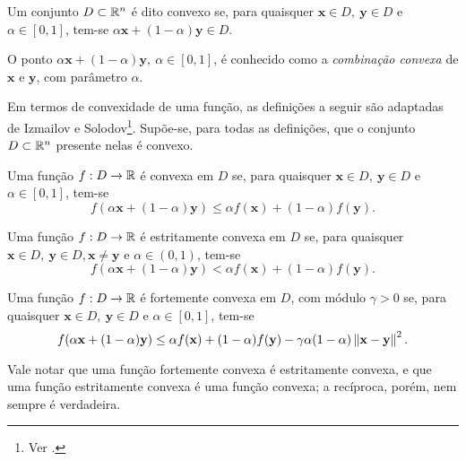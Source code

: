 \begin{definition}
Um conjunto $D \subset \mathbb{R}^{n}$ \'{e} dito convexo se, para quaisquer $\mathbf{x} \in D,~\mathbf{y} \in D$ e $\alpha \in [0,1]$, tem-se $\alpha\mathbf{x} + (1-\alpha)\mathbf{y} \in D$.
\end{definition}

O ponto $\alpha\mathbf{x} + (1-\alpha)\mathbf{y},~\alpha \in [0,1]$, \'{e} conhecido como a \textit{combina\c{c}\~{a}o convexa} de $\mathbf{x}$ e $\mathbf{y}$, com par\^{a}metro $\alpha$.

Em termos de convexidade de uma fun\c{c}\~{a}o, as defini\c{c}\~{o}es a seguir s\~{a}o adaptadas de Izmailov e Solodov\footnote{Ver \cite[pp. 66-70]{izmailov}.}. Sup\~{o}e-se, para todas as defini\c{c}\~{o}es, que o conjunto $D \subset \mathbb{R}^{n}$ presente nelas \'{e} convexo.

\begin{definition}\label{convDef}
Uma fun\c{c}\~{a}o $f: D \to \mathbb{R}$ \'{e} convexa em $D$ se, para quaisquer $\mathbf{x} \in D,~\mathbf{y} \in D$ e $\alpha \in [0,1]$, tem-se
\begin{equation}
f(\alpha\mathbf{x} + (1-\alpha)\mathbf{y}) \le \alpha f(\mathbf{x}) + (1-\alpha)f(\mathbf{y}).
\end{equation}
\end{definition}

\begin{definition}
Uma fun\c{c}\~{a}o $f: D \to \mathbb{R}$ \'{e} estritamente convexa em $D$ se, para quaisquer $\mathbf{x} \in D,~\mathbf{y} \in D, \mathbf{x} \ne \mathbf{y}$ e $\alpha \in (0,1)$, tem-se
\begin{equation}
f(\alpha\mathbf{x} + (1-\alpha)\mathbf{y}) < \alpha f(\mathbf{x}) + (1-\alpha)f(\mathbf{y}).
\end{equation}
\end{definition}

\begin{definition}
Uma fun\c{c}\~{a}o $f: D \to \mathbb{R}$ \'{e} fortemente convexa em $D$, com m\'{o}dulo $\gamma > 0$ se, para quaisquer $\mathbf{x} \in D,~\mathbf{y} \in D$ e $\alpha \in [0,1]$, tem-se
\begin{equation}
f(\alpha\mathbf{x} + (1-\alpha)\mathbf{y}) \le \alpha f(\mathbf{x}) + (1-\alpha)f(\mathbf{y}) - \gamma\alpha(1-\alpha)\left\lVert\mathbf{x}-\mathbf{y}\right\rVert^2.
\end{equation}
\end{definition}

Vale notar que uma fun\c{c}\~{a}o fortemente convexa \'{e} estritamente convexa, e que uma fun\c{c}\~{a}o estritamente convexa \'{e} uma fun\c{c}\~{a}o convexa; a rec\'{i}proca, por\'{e}m, nem sempre \'{e} verdadeira.

